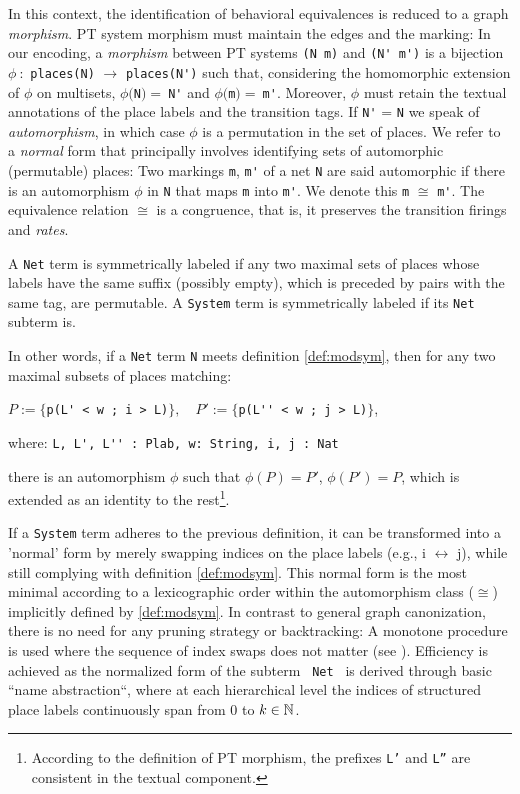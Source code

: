 In this context, the identification of behavioral equivalences is reduced to a graph \emph{morphism}. PT system morphism must maintain the edges and the marking: In our encoding,
a \emph{morphism} between PT systems \verb|(N m)| and \verb|(N' m')| is a bijection $\phi \ :$ \verb|places(N)| $\rightarrow$ \verb|places(N')| such that, considering the homomorphic extension of $\phi$ on multisets, $\phi($\verb|N|$) = \ $\verb|N'| and $\phi($\verb|m|$) = \ $\verb|m'|.
Moreover, $\phi$ must retain the textual annotations of the place labels and the transition tags. If \verb|N'| = \verb|N| we speak of \emph{automorphism}, in which case $\phi$ is a permutation in the set of places.
We refer to a \emph{normal} form that principally involves identifying sets of automorphic (permutable) places:
Two markings \verb|m|, \verb|m'| of a net \verb|N| are said automorphic if there is an automorphism $\phi$ in \verb|N| that maps \verb|m| into \verb|m'|.
We denote this \verb|m| $\cong$ \verb|m'|. The equivalence relation $\cong$ is a congruence, that is, it preserves the transition firings and \emph{rates}.
\begin{definition}
\label{def:modsym}
A \verb|Net| term is symmetrically labeled if any two maximal sets of places whose labels have the same suffix (possibly empty), which is preceded by pairs with the same tag, are permutable. A \verb|System| term is  symmetrically labeled if its \verb|Net| subterm is.
\end{definition}

\noindent In other words, if a \verb|Net| term \verb|N| meets definition \ref{def:modsym}, then for any two maximal subsets of places matching:

$P := \{$\verb|p(L' < w ; i > L)|$\}, \quad P' := \{$\verb|p(L'' < w ; j > L)|$\}$,

where: \verb|L, L', L'' : Plab, w: String, i, j : Nat| 

\noindent there is an automorphism $\phi$ such that $\phi(P) = P'$, $\phi(P') = P$,
which is extended as an identity to the rest\footnote{According to the definition of PT morphism, the prefixes \texttt{L'} and \texttt{L''} are consistent in the textual component.}.

If a \verb|System| term adheres to the previous definition, it can be transformed into a 'normal' form by merely swapping indices on the place labels (e.g., i $\leftrightarrow$ j), while still complying with definition \ref{def:modsym}. This normal form is the most minimal according to a lexicographic order within the automorphism class ($\cong$) implicitly defined by \ref{def:modsym}. In contrast to general graph canonization, there is no need for any pruning strategy or backtracking: A monotone procedure is used where the sequence of index swaps does not matter (see \cite{CAPRA-TCS2024}). Efficiency is achieved as the normalized form of the subterm \verb | Net | is derived through basic ``name abstraction``, where at each hierarchical level the indices of structured place labels continuously span from $0$ to $k \in \Nat$.  

